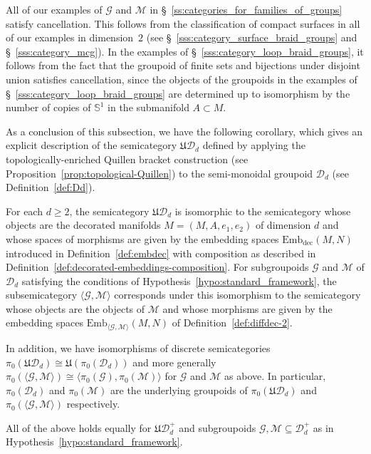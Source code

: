 \documentclass[AHL,Unicode,published]{cedram}
\newcommand{\rdec}{\mathrm{dec}}
\newcommand{\fU}{\ensuremath{\mathfrak{U}}}
\newcommand{\cD}{\mathcal{D}}
\newcommand{\cG}{\mathcal{G}}
\newcommand{\cM}{\mathcal{M}}
\newcommand{\bS}{\mathbb{S}}
\newcommand{\embdec}{\ensuremath{\mathrm{Emb}_{\rdec}}}
\newcommand{\embgm}{\ensuremath{\mathrm{Emb}_{\langle \cG,\cM \rangle}}}
\renewcommand{\geq}{\geqslant}
\begin{document}
\begin{rema}\label{rmk:cancellation1}
All of our examples of $\cG$ and $\cM$ in \S~\ref{ss:categories_for_families_of_groups} satisfy cancellation. This follows from the classification of compact surfaces in all of our examples in dimension~$2$ (see \S~\ref{sss:category_surface_braid_groups} and \S~\ref{sss:category_mcg}). In the examples of \S~\ref{sss:category_loop_braid_groups}, it follows from the fact that the groupoid of finite sets and bijections under disjoint union satisfies cancellation, since the objects of the groupoids in the examples of \S~\ref{sss:category_loop_braid_groups} are determined up to isomorphism by the number of copies of $\bS^{1}$ in the submanifold $A \subset M$.
\end{rema}

As a conclusion of this subsection, we have the following corollary, which gives an explicit description of the semicategory $\fU\cD_{d}$ defined by applying the topologically-enriched Quillen bracket construction (see Proposition~\ref{prop:topological-Quillen}) to the semi-monoidal groupoid $\cD_{d}$ (see Definition~\ref{def:Dd}).

\begin{coro}\label{cor:description_UD_{d}}
For each $d\geq 2$, the semicategory $\fU\cD_{d}$ is isomorphic to the semicategory whose objects are the decorated manifolds $M=(M,A,e_{1},e_{2})$ of dimension $d$ and whose spaces of morphisms are given by the embedding spaces $\embdec(M,N)$ introduced in Definition~\ref{def:embdec} with composition as described in Definition~\ref{def:decorated-embeddings-composition}. For subgroupoids $\cG$ and $\cM$ of $\cD_{d}$ satisfying the conditions of Hypothesis~\ref{hypo:standard_framework}, the subsemicategory $\langle \cG, \cM \rangle$ corresponds under this isomorphism to the semicategory whose objects are the objects of $\cM$ and whose morphisms are given by the embedding spaces $\embgm(M,N)$ of Definition~\ref{def:diffdec-2}.

In addition, we have isomorphisms of discrete semicategories $\pi_{0}(\fU\cD_{d}) \cong \fU(\pi_{0}(\cD_{d}))$ and more generally $\pi_{0}(\langle \cG, \cM \rangle) \cong \langle \pi_{0}(\cG), \pi_{0}(\cM) \rangle$ for $\cG$ and $\cM$ as above. In particular, $\pi_{0}(\cD_{d})$ and $\pi_{0}(\cM)$ are the underlying groupoids of $\pi_{0}(\fU\cD_{d})$ and $\pi_{0}(\langle \cG, \cM \rangle)$ respectively.

All of the above holds equally for $\fU\cD_{d}^{+}$ and subgroupoids $\cG, \cM \subseteq \cD_{d}^{+}$ as in Hypothesis~\ref{hypo:standard_framework}.
\end{coro}
\end{document}
